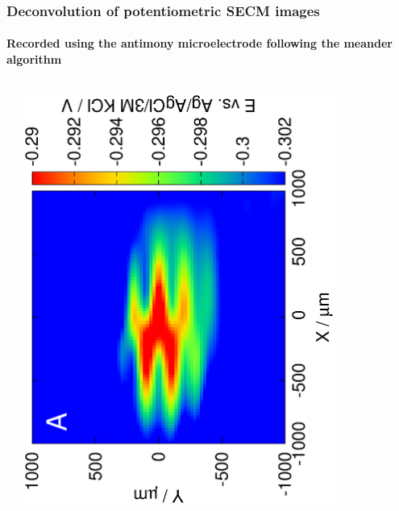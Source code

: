 \documentclass{beamer}
\begin{document}
\begin{frame}
	\frametitle{Deconvolution of potentiometric SECM images}
	\framesubtitle{Recorded using the antimony microelectrode following the meander algorithm}
\centering

\def\s{0.15}

\begin{columns}[T] %

\begin{column}{.2\textwidth}
\begin{minipage}[c][0.75\textheight][c]{\linewidth}
\centering
\end{minipage}
\end{column}%
\hfill%
\begin{column}{.2\textwidth}
\centering
\includegraphics[trim = 10mm 30mm 0mm 10mm, clip, width=0.8\textwidth, angle=-90]{13121313.eps}\\

\end{column}
\end{columns}
\end{frame}
\end{document}
